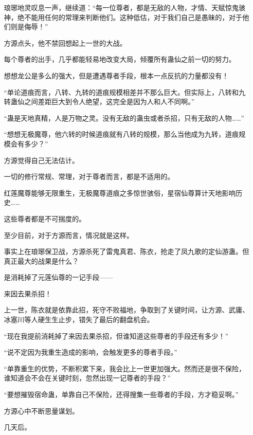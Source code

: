 
\begin{this_body}



琅琊地灵叹息一声，继续道：“每一位尊者，都是无敌的人物，才情、天赋惊鬼骇神，绝不能用任何的常理来判断他们。这种低估，对于我们自己是愚昧的，对于他们则是侮辱！”

方源点头，他不禁回想起上一世的大战。

每个尊者的出手，几乎都能轻易地改变大局，倾覆所有蛊仙之前一切的努力。

想想龙公是多么的强大，但是遭遇尊者手段，根本一点反抗的力量都没有！

“单论道痕而言，八转、九转的道痕规模相差并不那么巨大。但实际上，八转和九转蛊仙之间差距巨大到令人绝望，这完全是因为人和人不同啊。”

“蛊是天地真精，人是万物之灵。没有无敌的蛊虫或者杀招，只有无敌的人物……”

“想想无极魔尊，他六转的时候道痕就有八转的规模，那么当他成为九转，道痕规模会有多少？”

方源觉得自己无法估计。

一切的修行常规、常理，对于尊者而言，都是不适用的。

红莲魔尊能够无限重生，无极魔尊道痕之多惊世骇俗，星宿仙尊算计天地影响历史……

这些尊者都是不可揣度的。

至少目前，对于方源而言，情况就是这样。

事实上在琅琊保卫战，方源杀死了雷鬼真君、陈衣，抢走了凤九歌的定仙游蛊。但真正最大的战果是什么？

是消耗掉了元莲仙尊的一记手段——

来因去果杀招！

上一世，陈衣就是依靠此招，死守不败福地，争取到了关键时间，让方源、武庸、冰塞川等人硬生生止步，错失了最后的翻盘机会。

“现在我提前消耗掉了来因去果杀招，但谁知道这些尊者的手段还有多少！”

“说不定因为我重生造成的影响，会触发更多的尊者手段。”

“单靠重生的优势，不断积累下来，我会比上一世更加强大。然而还是很不保险，谁知道会不会在关键时刻，忽然出现一记尊者的手段？”

“要想摧毁宿命蛊，单靠自己不保险，还得搜集一些尊者的手段，方才稳妥啊。”

方源心中不断思量谋划。

几天后。


\end{this_body}
